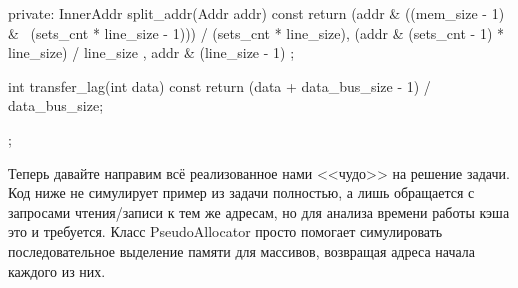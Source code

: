 \documentclass[14pt, russian, onesize]{extreport}
\begin{document}
\begin{cppcode}
{private:
    InnerAddr split_addr(Addr addr) const {
        return {
            (addr & ((mem_size - 1) & ~(sets_cnt * line_size - 1))) / (sets_cnt * line_size),
            (addr & (sets_cnt - 1) * line_size) / line_size ,
            addr & (line_size - 1)
        };
    }

    int transfer_lag(int data) const {
        return (data + data_bus_size - 1) / data_bus_size;
    }

};
\end{cppcode}

Теперь давайте направим всё реализованное нами <<чудо>> на решение задачи.
Код ниже не симулирует пример из задачи полностью, а лишь обращается
с запросами чтения\slash записи
к тем же адресам, но для анализа времени работы кэша это и требуется.
Класс PseudoAllocator просто помогает симулировать
последовательное выделение памяти для массивов, возвращая 
адреса начала каждого из них.
\end{document}

